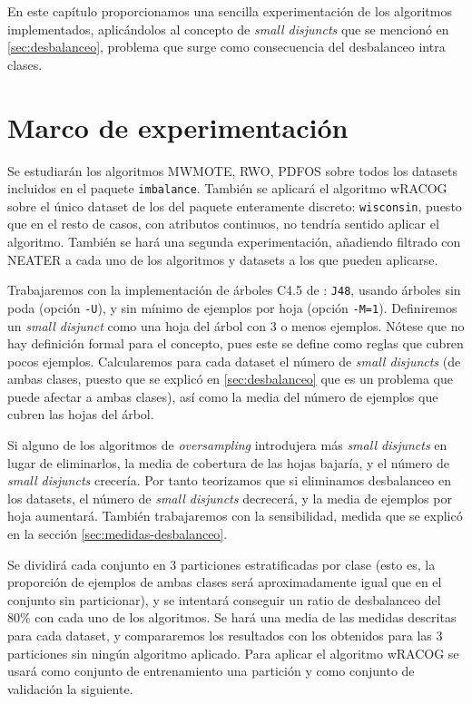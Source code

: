 \label{ch:sdisjuncts}
En este capítulo proporcionamos una sencilla experimentación de los algoritmos implementados, aplicándolos al concepto de 
\textit{small disjuncts} que se mencionó en \ref{sec:desbalanceo}, problema que surge como consecuencia del desbalanceo
intra clases.

\section{Marco de experimentación}
Se estudiarán los algoritmos MWMOTE, RWO, PDFOS sobre todos los datasets incluidos en el paquete \texttt{imbalance}. 
También se aplicará el algoritmo wRACOG sobre el único dataset de los del paquete enteramente discreto: \texttt{wisconsin},
puesto que en el resto de casos, con atributos continuos, no tendría sentido aplicar el algoritmo. También se hará una 
segunda experimentación, añadiendo filtrado con NEATER a cada uno de los algoritmos y datasets a los que pueden aplicarse.

Trabajaremos con la implementación de árboles C4.5 de : \texttt{J48}, usando árboles sin poda 
(opción \texttt{-U}), y sin mínimo de ejemplos por hoja (opción \texttt{-M=1}). 
Definiremos un \textit{small disjunct} como una hoja del árbol con 3 o menos ejemplos. Nótese 
que no hay definición formal para el concepto, pues este se define como reglas que cubren pocos ejemplos. Calcularemos para 
cada dataset el número de \textit{small disjuncts} (de ambas clases, puesto que se explicó en \ref{sec:desbalanceo} que 
es un problema que puede afectar a ambas clases), así como la media del número de ejemplos que cubren las hojas del árbol.

Si alguno de los algoritmos de \textit{oversampling} introdujera más \textit{small disjuncts} en lugar de eliminarlos, 
la media de cobertura de las hojas bajaría, y el número de \textit{small disjuncts} crecería. Por tanto teorizamos que si eliminamos 
desbalanceo en los datasets, el número de \textit{small disjuncts} decrecerá, y la media de ejemplos por hoja aumentará. 
También trabajaremos con la sensibilidad, medida que se explicó en la sección \ref{sec:medidas-desbalanceo}.

Se dividirá cada conjunto en 3 particiones estratificadas por clase (esto es, la proporción de ejemplos de ambas
clases será aproximadamente igual que en el conjunto sin particionar), y se intentará conseguir un ratio de desbalanceo del
80\% con cada uno de los algoritmos. Se hará una media de las medidas descritas para cada dataset, y compararemos los 
resultados con los obtenidos para las 3 particiones sin ningún algoritmo aplicado. Para aplicar el algoritmo wRACOG se usará
como conjunto de entrenamiento una partición y como conjunto de validación la siguiente.

